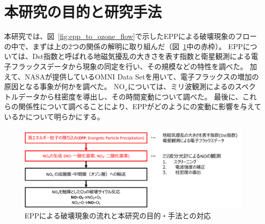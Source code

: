 \section{本研究の目的と研究手法}
\label{sec:intro_porpose}
本研究では、図~\ref{fig:epp_to_ozone_flow}で示したEPPによる破壊現象のフローの中で、まずは上の2つの関係の解明に取り組んだ（図~\ref{fig:flow_and_porpose}中の赤枠）。
EPPについては、Dst指数と呼ばれる地磁気擾乱の大きさを表す指数と衛星観測による電子フラックスデータから現象の同定を行い、その規模などの特性を調べた。
加えて、NASAが提供しているOMNI Data Setを用いて、電子フラックスの増加の原因となる事象が何かを調べた。
$\mathrm{NO}_x$については、ミリ波観測によるのスペクトルデータから柱密度を導出し、その時間変動について調べた。
最後に、これらの関係性について調べることにより、EPPがどのようにの変動に影響を与えているかについて明らかにする。
\begin{figure}[htbp]
    \centering
    \includegraphics[width=\linewidth]{master_thesis_contents/master_thesis_fig/flow_and_porpose.pdf}
    \caption{EPPによる破壊現象の流れと本研究の目的・手法との対応}
    \label{fig:flow_and_porpose}
\end{figure}
